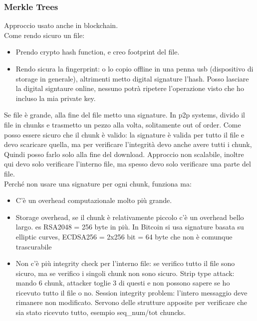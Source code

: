 \documentclass[16px]{article}
\begin{document}
\subsubsection{Merkle Trees}
Approccio usato anche in blockchain.\\ Come rendo sicuro un file: 
\begin{itemize}
\item Prendo crypto hash function, e creo footprint del file.
\item Rendo sicura la fingerprint: o lo copio offline in una penna usb (dispositivo di storage in generale), altrimenti metto digital signature l'hash. Posso lasciare la digital signtaure online, nessuno potrà ripetere l'operazione visto che ho incluso la mia private key.
\end{itemize}
Se file è grande, alla fine del file metto una signature. In p2p systems, divido il file in chunks e trasmetto un pezzo alla volta, solitamente out of order. Come posso essere sicuro che il chunk è valido: la signature è valida per tutto il file e devo scaricare quella, ma per verificare l'integrità devo anche avere tutti i chunk, Quindi posso farlo solo alla fine del download. Approccio non scalabile, inoltre qui devo solo verificare l'interno file, ma spesso devo solo verificare una parte del file.\\ Perché non usare una signature per ogni chunk, funziona ma:
\begin{itemize}
\item C'è un overhead computazionale molto più grande.
\item Storage overhead, se il chunk è relativamente piccolo c'è un overhead bello largo. es RSA2048 = 256 byte in più. In Bitcoin si usa signature basata su elliptic curves, ECDSA256 = 2x256 bit = 64 byte che non è comunque trascurabile
\item Non c'è più integrity check per l'interno file: se verifico tutto il file sono sicuro, ma se verifico i singoli chunk non sono sicuro. Strip type attack: mando 6 chunk, attacker toglie 3 di questi e non possono sapere se ho ricevuto tutto il file o no. Session integrity problem: l'intero messaggio deve rimanere non modificato. Servono delle strutture apposite per verificare che sia stato ricevuto tutto, esempio seq\_num/tot chuncks.
\end{itemize}
\end{document}

